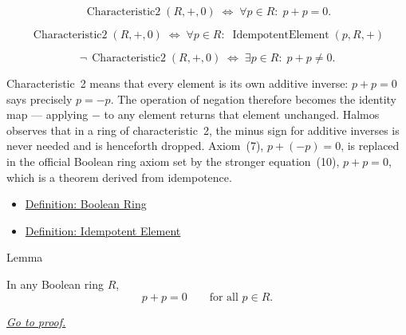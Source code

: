 \begin{remark*}
\[
\operatorname{Characteristic2}(R,+,0)
\;\Longleftrightarrow\;
\forall p \in R{:}\; p + p = 0.
\]
\end{remark*}

\begin{remark*}
\[
\operatorname{Characteristic2}(R,+,0)
\;\Longleftrightarrow\;
\forall p \in R{:}\;
\operatorname{IdempotentElement}(p, R, +)
\]
\end{remark*}

\begin{remark*}
\[
\neg\,\operatorname{Characteristic2}(R,+,0)
\;\Longleftrightarrow\;
\exists p \in R{:}\; p + p \neq 0.
\]
\end{remark*}

\begin{remark*}[Interpretation]
Characteristic~2 means that every element is its own additive
inverse: $p + p = 0$ says precisely $p = -p$.  The operation of
negation therefore becomes the identity map --- applying $-$ to
any element returns that element unchanged.  Halmos observes that
in a ring of characteristic~2, the minus sign for additive inverses
is never needed and is henceforth dropped.  Axiom~(7),
$p + (-p) = 0$, is replaced in the official Boolean ring axiom set
by the stronger equation~(10), $p + p = 0$, which is a theorem
derived from idempotence.
\end{remark*}

\begin{remark*}[Dependencies]
\begin{itemize}
  \item \hyperref[def:boolean-ring]{Definition: Boolean Ring}
  \item \hyperref[def:idempotent-element]{Definition: Idempotent Element}
\end{itemize}
\end{remark*}


\begin{lemmabox}{Lemma}
\begin{lemma}
\label{lem:self-additive-inverse}
In any Boolean ring $R$,
\[
p + p = 0 \qquad \text{for all } p \in R.
\]

\smallskip
\noindent
\hyperref[prf:self-additive-inverse]{\textit{Go to proof.}}
\end{lemma}
\end{lemmabox}


